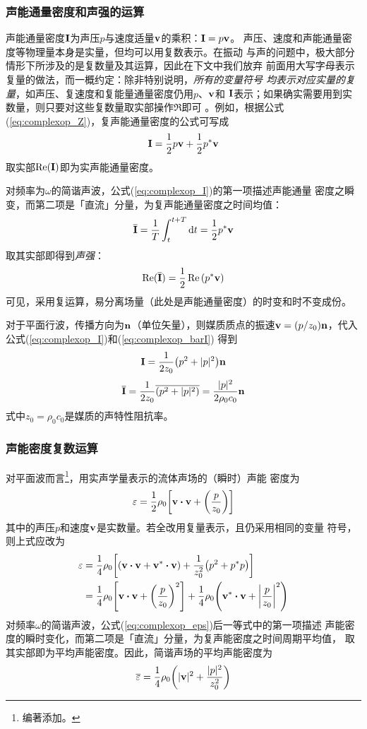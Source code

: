 \documentclass[UTF8]{ctexbook}
\begin{document}
\subsubsection{声能通量密度和声强的运算}
声能通量密度$\vb{I}$为声压$p$与速度适量$\vb{v}$的乘积：$\vb{I}=p \vb{v}$。
声压、速度和声能通量密度等物理量本身是实量，但均可以用复数表示。在振动
与声的问题中，极大部分情形下所涉及的是复数量及其运算，因此在下文中我们放弃
前面用大写字母表示复量的做法，而一概约定：除非特别说明，\emph{所有的变量符号
均表示对应实量的复量}，如声压、复速度和复能量通量密度仍用$p$、$\vb{v}$和
$\vb{I}$表示；如果确实需要用到实数量，则只要对这些复数量取实部操作$\Re$即可
。例如，根据公式(\ref{eq:complexop_Z})，复声能通量密度的公式可写成
\begin{equation}
	\label{eq:complexop_I}
	\vb{I} = \frac12 p\vb{v} + \frac12 p^* \vb{v}
\end{equation}
取实部$\Re(\vb{I})$即为实声能通量密度。

对频率为$\omega$的简谐声波，公式(\ref{eq:complexop_I})的第一项描述声能通量
密度之瞬变，而第二项是「直流」分量，为复声能通量密度之时间均值：
\begin{equation}
	\label{eq:complexop_barI}
	\overline{\vb{I}} = \frac1T \int_t^{t+T}\dd{t} = \frac12 p^* \vb{v}
\end{equation}
取其实部即得到\emph{声强}：
$$\Re(\overline{\vb{I}}) = \frac12 \Re\qty(p^* \vb{v})$$
可见，采用复运算，易分离场量（此处是声能通量密度）的时变和时不变成份。

对于平面行波，传播方向为$\vb{n}$（单位矢量），则媒质质点的振速$\vb{v}
=(p/z_0)\vb{n}$，代入公式(\ref{eq:complexop_I})和(\ref{eq:complexop_barI})
得到
$$\vb{I} = \frac{1}{2z_0}\qty(p^2+|p|^2)\vb{n}$$
$$\overline{\vb{I}} = \frac{1}{2z_0} \overline{\qty(p^2+|p|^2)}
=\frac{|p|^2}{2\rho_0 c_0 }\vb{n}$$
式中$z_0=\rho_0c_0$是媒质的声特性阻抗率。

\subsubsection{声能密度复数运算}
对平面波而言\footnote{编著添加。}，用实声学量表示的流体声场的（瞬时）声能
密度为
$$\eps = \frac12 \rho_0 \qty[\vb{v} \vdot \vb{v} +\qty(\frac{p}{z_0})]$$
其中的声压$p$和速度$\vb{v}$是实数量。若全改用复量表示，且仍采用相同的变量
符号，则上式应改为
\begin{align}
	\label{eq:complexop_eps}
	\eps & = \frac14 \rho_0 \qty[(\vb{v}\vdot\vb{v} + \vb{v}^*\vdot
	\vb{v}) +\frac{1}{z_0^2} \qty(p^2+p^* p)]\nonumber\\
	& = \frac14 \rho_0 \qty[\vb{v}\vdot\vb{v}+ \qty(\frac{p}{z_0} )^2]
	+\frac14 \rho_0 \qty(\vb{v}^*\vdot \vb{v} + \qty|\frac{p}{z_0}|^2)
\end{align}
对频率$\omega$的简谐声波，公式(\ref{eq:complexop_eps})后一等式中的第一项描述
声能密度的瞬时变化，而第二项是「直流」分量，为复声能密度之时间周期平均值，
取其实部即为平均声能密度。因此，简谐声场的平均声能密度为
\begin{equation}
	\label{eq:complexop_bareps}
	\overline{\varepsilon} = \frac14 \rho_0 \qty(|\vb{v}|^2 +\frac{|p|^2}{z_0^2})
\end{equation}
\end{document}
